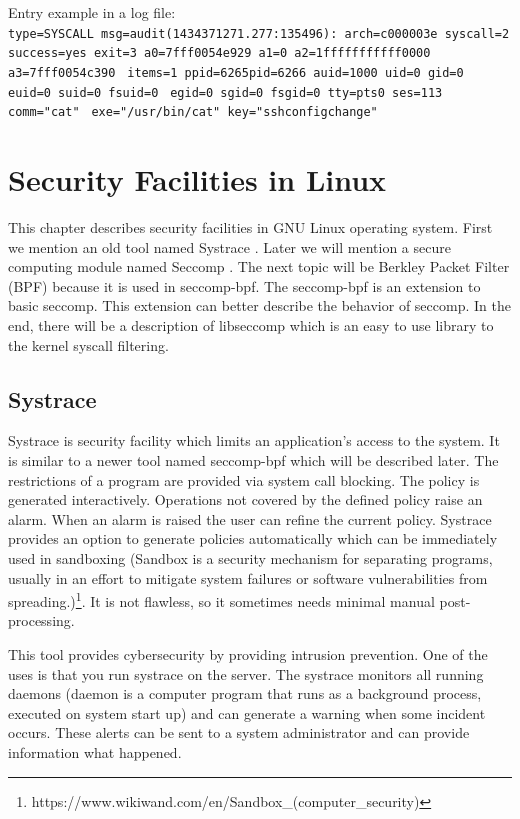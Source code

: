 \pagebreak
Entry example in a log file:\\
\noindent
\texttt{type=SYSCALL msg=audit(1434371271.277:135496): arch=c000003e syscall=2}\linebreak
\texttt{success=yes exit=3 a0=7fff0054e929 a1=0 a2=1fffffffffff0000 a3=7fff0054c390 }\linebreak
\texttt{items=1 ppid=6265pid=6266 auid=1000 uid=0 gid=0 euid=0 suid=0 fsuid=0 }\linebreak
\texttt{egid=0 sgid=0 fsgid=0 tty=pts0 ses=113 comm="cat" }\linebreak
\texttt{exe="/usr/bin/cat" key="sshconfigchange"}


\chapter{Security Facilities in Linux}
\label{chap:third}
This chapter describes security facilities in GNU Linux operating system.
First we mention an old tool named Systrace \cite{systrace_web}.
Later we will mention a secure computing module named Seccomp \cite{seccomp_sandbox}.
The next topic will be Berkley Packet Filter (BPF) because it is used in seccomp-bpf.
The seccomp-bpf is an extension to basic seccomp.
This extension can better describe the behavior of seccomp.
In the end, there will be a description of libseccomp which is an easy to use library to the kernel syscall filtering.

\section{Systrace}
Systrace is security facility which limits an application's access to the system.
It is similar to a newer tool named seccomp-bpf which will be described later.
The restrictions of a program are provided via system call blocking.
The policy is generated interactively.
Operations not covered by the defined policy raise an alarm.
When an alarm is raised the user can refine the current policy.
Systrace provides an option to generate policies automatically which can be immediately used in sandboxing
(Sandbox is a security mechanism for separating programs, usually in an effort to mitigate system failures or software vulnerabilities from spreading.)\footnote{https://www.wikiwand.com/en/Sandbox\_(computer\_security)}.
It is not flawless, so it sometimes needs minimal manual post-processing.

This tool provides cybersecurity by providing intrusion prevention.
One of the uses is that you run systrace on the server.
The systrace monitors all running daemons (daemon is a computer program that runs as a background process, executed on system start up) and can generate a warning when some incident occurs.
These alerts can be sent to a system administrator and can provide information what happened.

